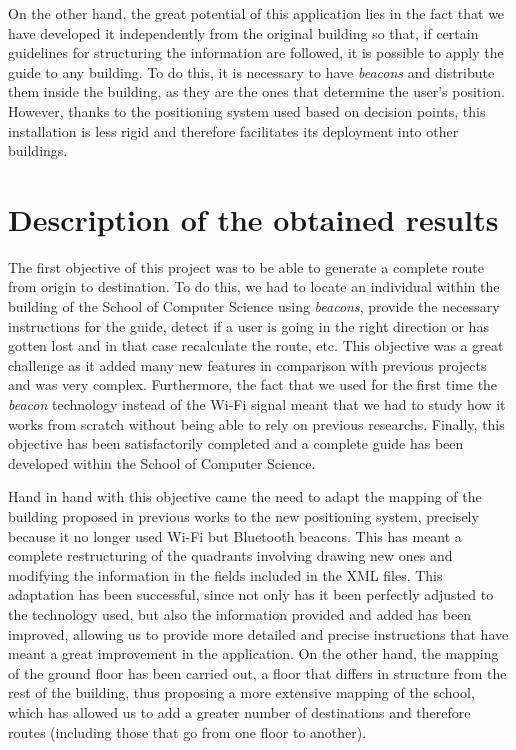 On the other hand, the great potential of this application lies in the fact that we have developed it independently from the original building so that, if certain guidelines for structuring the information are followed, it is possible to apply the guide to any building. To do this, it is necessary to have \textit{beacons} and distribute them inside the building, as they are the ones that determine the user's position. However, thanks to the positioning system used based on decision points, this installation is less rigid and therefore facilitates its deployment into other buildings. 


\section{Description of the obtained results}
\label{sec:descResult_eng}

The first objective of this project was to be able to generate a complete route from origin to destination. To do this, we had to locate an individual within the building of the School of Computer Science using \textit{beacons}, provide the necessary instructions for the guide, detect if a user is going in the right direction or has gotten lost and in that case recalculate the route, etc. This objective was a great challenge as it added many new features in comparison with previous projects and was very complex. Furthermore, the fact that we used for the first time the \textit{beacon} technology instead of the Wi-Fi signal meant that we had to study how it works from scratch without being able to rely on previous researchs. Finally, this objective has been satisfactorily completed and a complete guide has been developed within the School of Computer Science.

Hand in hand with this objective came the need to adapt the mapping of the building proposed in previous works to the new positioning system, precisely because it no longer used Wi-Fi but Bluetooth beacons. This has meant a complete restructuring of the quadrants involving drawing new ones and modifying the information in the fields included in the XML files. This adaptation has been successful, since not only has it been perfectly adjusted to the technology used, but also the information provided and added has been improved, allowing us to provide more detailed and precise instructions that have meant a great improvement in the application. On the other hand, the mapping of the ground floor has been carried out, a floor that differs in structure from the rest of the building, thus proposing a more extensive mapping of the school, which has allowed us to add a greater number of destinations and therefore routes (including those that go from one floor to another).

